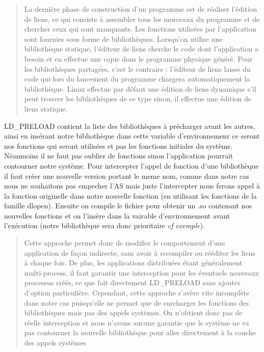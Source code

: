 \documentclass{article}
\begin{document}
\begin{quotation} 
{\color{green} La dernière phase de construction d’un programme est de réaliser
  l’édition de liens, ce qui consiste à assembler tous les morceaux du programme
  et de chercher ceux qui sont manquants.  Les fonctions utilisées par
  l’application sont fournies sous forme de bibliothèques. Lorsqu’on utilise une
  bibliothèque statique, l’éditeur de liens cherche le code dont l’application a
  besoin et en effectue une copie dans le programme physique généré. Pour les
  bibliothèques partagées, c’est le contraire : l’éditeur de liens laisse du
  code qui lors du lancement du programme chargera automatiquement la
  bibliothèque. Linux effectue par défaut une édition de liens dynamique s’il
  peut trouver les bibliothèques de ce type sinon, il effectue une édition de
  liens statique.  }
\end{quotation}

LD\_PRELOAD contient la liste des bibliothèques à précharger avant les autres,
ainsi en insérant notre bibliothèque dans cette variable d'environnemenr ce
seront nos fonctions qui seront utilisées et pas les fonctions initiales du
système. Néanmoins il ne faut pas oublier de fonctions sinon l'application
pourrait contourner notre système. Pour intercepter l'appel de fonction d'une
bibliothèque il faut créer une nouvelle version portant le meme nom, comme dans
notre cas nous ne souhaitons pas empecher l'AS mais juste l'intercepter nous
ferons appel à la fonction originelle dans notre nouvelle fonction (en utilisant
les fonctions de la famille dlopen). Ensuite on compile le fichier pour obtenir
un .so contenant nos nouvelles fonctions et on l'insère dans la vairable
d'environnement avant l'exécution (notre bibliothèque sera donc prioritaire
\textit{cf exemple}).

\begin{quotation}
{\color{green} Cette approche permet donc de modifier le comportement d’une
  application de façon indirecte, sans avoir à recompiler ou rééditer les liens
  à chaque fois. De plus, les applications distribuées étant généralement
  multi-process, il faut garantir une interception pour les éventuels nouveaux
  processus créés, ce que fait directement LD\_PRELOAD sans ajouter d’option
  particulière. Cependant, cette approche s’avère vite incomplète dans notre cas
  puisqu’elle ne permet que de surcharger les fonctions des bibliothèques mais
  pas des appels systèmes. On n’obtient donc pas de réelle interception et nous
  n’avons aucune garantie que le système ne va pas contourner la nouvelle
  bibliothèque pour aller directement à la couche des appels systèmes}
\end{quotation}
\end{document}
